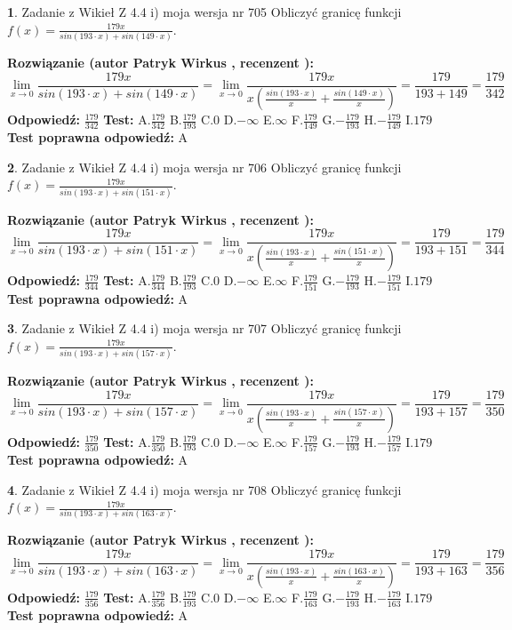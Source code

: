 \documentclass[12pt, a4paper]{article}
\theoremstyle{definition} %
\newtheorem{zad}{}
\newcommand{\zadStart}[1]{\begin{zad}#1\newline}
\newcommand{\zadStop}{\end{zad}}
\newcommand{\rozwStart}[2]{\noindent \textbf{Rozwiązanie (autor #1 , recenzent #2): }\newline}
\newcommand{\rozwStop}{\newline}
\newcommand{\odpStart}{\noindent \textbf{Odpowiedź:}\newline}
\newcommand{\odpStop}{\newline}
\newcommand{\testStart}{\noindent \textbf{Test:}\newline}
\newcommand{\testStop}{\newline}
\newcommand{\kluczStart}{\noindent \textbf{Test poprawna odpowiedź:}\newline}
\newcommand{\kluczStop}{\newline}
\begin{document}
\zadStart{Zadanie z Wikieł Z 4.4 i) moja wersja nr 705}
Obliczyć granicę funkcji $f(x)=\frac{179x}{sin(193\cdot x) +sin(149\cdot x)}$.
\zadStop
\rozwStart{Patryk Wirkus}{}
$$\lim\limits_{x\to 0}\frac{179x}{sin(193\cdot x) +sin(149\cdot x)}=\lim\limits_{x\to 0}\frac{179x}{x(\frac{sin(193\cdot x)}{x}+\frac{sin(149\cdot x)}{x})}=\frac{179}{193+149} = \frac{179}{342}$$
\rozwStop
\odpStart
$\frac{179}{342}$
\odpStop
\testStart
A.$\frac{179}{342}$
B.$\frac{179}{193}$
C.$0$
D.$-\infty$
E.$\infty$
F.$\frac{179}{149}$
G.$-\frac{179}{193}$
H.$-\frac{179}{149}$
I.$179$
\testStop
\kluczStart
A
\kluczStop



\zadStart{Zadanie z Wikieł Z 4.4 i) moja wersja nr 706}
Obliczyć granicę funkcji $f(x)=\frac{179x}{sin(193\cdot x) +sin(151\cdot x)}$.
\zadStop
\rozwStart{Patryk Wirkus}{}
$$\lim\limits_{x\to 0}\frac{179x}{sin(193\cdot x) +sin(151\cdot x)}=\lim\limits_{x\to 0}\frac{179x}{x(\frac{sin(193\cdot x)}{x}+\frac{sin(151\cdot x)}{x})}=\frac{179}{193+151} = \frac{179}{344}$$
\rozwStop
\odpStart
$\frac{179}{344}$
\odpStop
\testStart
A.$\frac{179}{344}$
B.$\frac{179}{193}$
C.$0$
D.$-\infty$
E.$\infty$
F.$\frac{179}{151}$
G.$-\frac{179}{193}$
H.$-\frac{179}{151}$
I.$179$
\testStop
\kluczStart
A
\kluczStop



\zadStart{Zadanie z Wikieł Z 4.4 i) moja wersja nr 707}
Obliczyć granicę funkcji $f(x)=\frac{179x}{sin(193\cdot x) +sin(157\cdot x)}$.
\zadStop
\rozwStart{Patryk Wirkus}{}
$$\lim\limits_{x\to 0}\frac{179x}{sin(193\cdot x) +sin(157\cdot x)}=\lim\limits_{x\to 0}\frac{179x}{x(\frac{sin(193\cdot x)}{x}+\frac{sin(157\cdot x)}{x})}=\frac{179}{193+157} = \frac{179}{350}$$
\rozwStop
\odpStart
$\frac{179}{350}$
\odpStop
\testStart
A.$\frac{179}{350}$
B.$\frac{179}{193}$
C.$0$
D.$-\infty$
E.$\infty$
F.$\frac{179}{157}$
G.$-\frac{179}{193}$
H.$-\frac{179}{157}$
I.$179$
\testStop
\kluczStart
A
\kluczStop



\zadStart{Zadanie z Wikieł Z 4.4 i) moja wersja nr 708}
Obliczyć granicę funkcji $f(x)=\frac{179x}{sin(193\cdot x) +sin(163\cdot x)}$.
\zadStop
\rozwStart{Patryk Wirkus}{}
$$\lim\limits_{x\to 0}\frac{179x}{sin(193\cdot x) +sin(163\cdot x)}=\lim\limits_{x\to 0}\frac{179x}{x(\frac{sin(193\cdot x)}{x}+\frac{sin(163\cdot x)}{x})}=\frac{179}{193+163} = \frac{179}{356}$$
\rozwStop
\odpStart
$\frac{179}{356}$
\odpStop
\testStart
A.$\frac{179}{356}$
B.$\frac{179}{193}$
C.$0$
D.$-\infty$
E.$\infty$
F.$\frac{179}{163}$
G.$-\frac{179}{193}$
H.$-\frac{179}{163}$
I.$179$
\testStop
\kluczStart
A
\kluczStop
\end{document}
